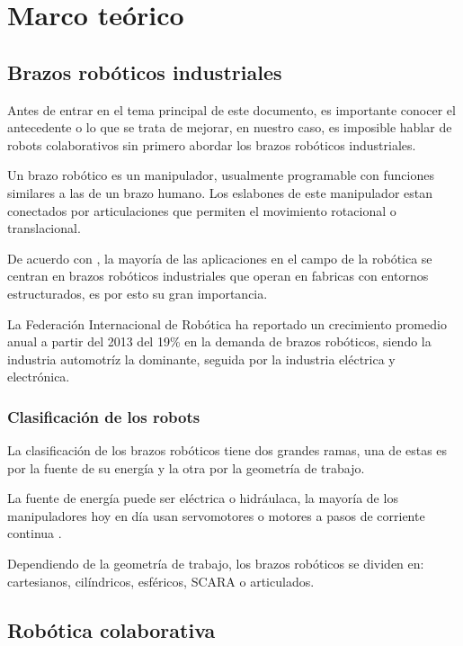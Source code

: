 \chapter{Marco teórico}

\section{Brazos robóticos industriales}

Antes de entrar en el tema principal de este documento, es importante conocer el antecedente o lo que se trata de mejorar, en nuestro caso, es imposible hablar de robots colaborativos sin primero abordar los brazos robóticos industriales.

Un brazo robótico es un manipulador, usualmente programable con funciones similares a las de un brazo humano. Los eslabones de este manipulador estan conectados por articulaciones que permiten el movimiento rotacional o translacional. \cite{ReviewRoboticArm} \cite{Schilling2001}

De acuerdo con \cite{Spong2005}, la mayoría de las aplicaciones en el campo de la robótica se centran en brazos robóticos industriales que operan en fabricas con entornos estructurados, es por esto su gran importancia.

La Federación Internacional de Robótica ha reportado un crecimiento promedio anual a partir del 2013 del 19\% en la demanda de brazos robóticos, siendo la industria automotríz la dominante, seguida por la industria eléctrica y electrónica. \cite{summary2019}


\subsection{Clasificación de los robots}

La clasificación de los brazos robóticos tiene dos grandes ramas, una de estas es por la fuente de su energía y la otra por la geometría de trabajo. 

La fuente de energía puede ser eléctrica o hidráulaca, la mayoría de los manipuladores hoy en día usan servomotores o motores a pasos de corriente continua \cite{Schilling2001}.

Dependiendo de la geometría de trabajo, los brazos robóticos  se dividen en: cartesianos, cilíndricos, esféricos, SCARA o articulados.


\section{Robótica colaborativa}

